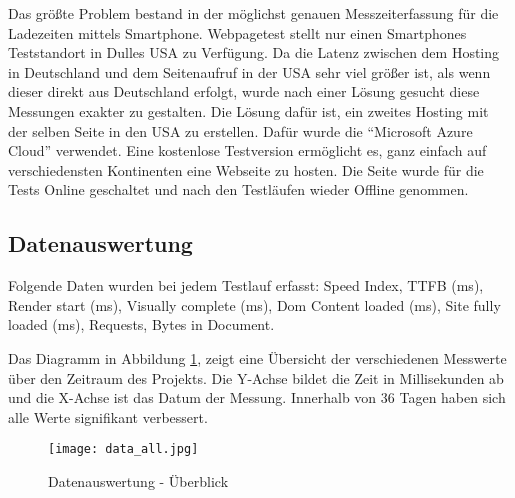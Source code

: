 		Das größte Problem bestand in der möglichst genauen Messzeiterfassung für die Ladezeiten mittels Smartphone. Webpagetest stellt nur einen Smartphones Teststandort in Dulles USA zu Verfügung. Da die Latenz zwischen dem Hosting in Deutschland und dem Seitenaufruf in der USA sehr viel größer ist, als wenn dieser direkt aus Deutschland erfolgt, wurde nach einer Lösung gesucht diese Messungen exakter zu gestalten.
		Die Lösung dafür ist, ein zweites Hosting mit der selben Seite in den USA zu erstellen. Dafür wurde die "`Microsoft Azure Cloud"' verwendet. Eine kostenlose Testversion ermöglicht es, ganz einfach auf verschiedensten Kontinenten eine Webseite zu hosten. Die Seite wurde für die Tests Online geschaltet und nach den Testläufen wieder Offline genommen.


	\subsection{Datenauswertung}
	\label{sub:datenauswertung}
		Folgende Daten wurden bei jedem Testlauf erfasst: Speed Index, TTFB (ms), Render start (ms), Visually complete (ms), Dom Content loaded (ms), Site fully loaded (ms), Requests, Bytes in Document.

    Das Diagramm in Abbildung \ref{fig:data_all}, zeigt eine Übersicht der verschiedenen Messwerte über den Zeitraum des Projekts. Die Y-Achse bildet die Zeit in Millisekunden ab und die X-Achse ist das Datum der Messung. Innerhalb von 36 Tagen haben sich alle Werte signifikant verbessert.

    \begin{figure}[htbp]
    	\begin{center}
    		\texttt{[image: data\_all.jpg]}
    		\caption{Datenauswertung - Überblick}
    		\label{fig:data_all}
    	\end{center}
    \end{figure}

